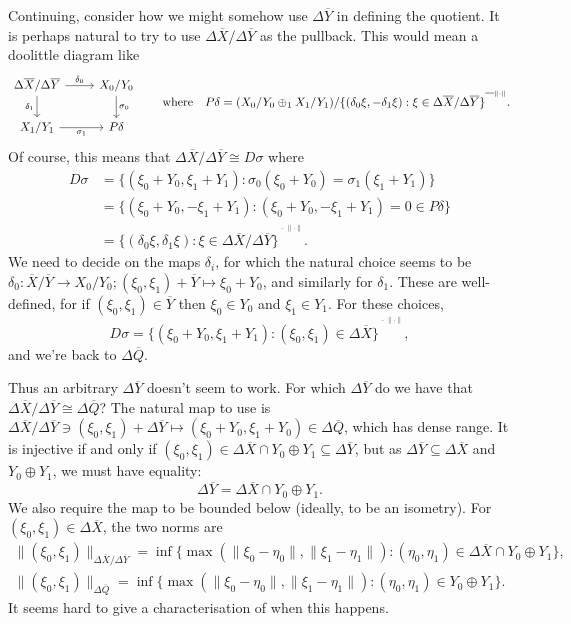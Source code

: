 \documentclass[a4paper,11pt]{article}
\theoremstyle{plain}
\theoremstyle{remark}
\newenvironment{remark}
  {\pushQED{\qed}\renewcommand{\qedsymbol}{$\triangle$}\remarkx}
  {\popQED\endremarkx}
\begin{document}
\begin{remark}
Continuing, consider how we might somehow use $\Delta\overline Y$ in defining the quotient.  It is perhaps natural to try to use $\Delta\overline X / \Delta\overline Y$ as the pullback.  This would mean a doolittle diagram like
\[ \begin{tikzcd}
\Delta\overline X / \Delta\overline Y \arrow[r, "\delta_0"] \arrow[d, "\delta_1"'] & X_0/Y_0 \arrow[d, "\sigma_0"] \\
X_1/Y_1 \arrow[r, "\sigma_1"'] & P\delta
\end{tikzcd}
\qquad\text{where}\quad
P\delta = (X_0/Y_0 \oplus_1 X_1/Y_1) / \{ (\delta_0\xi,-\delta_1\xi) : \xi\in \Delta\overline X / \Delta\overline Y \}^{\overline{\phantom{\{\ }}^{\|\cdot\|}}. \]
Of course, this means that $\Delta\overline X / \Delta\overline Y \cong D\sigma$ where
\begin{align*}
D\sigma &= \{ (\xi_0+Y_0, \xi_1+Y_1) : \sigma_0(\xi_0+Y_0) = \sigma_1(\xi_1+Y_1) \}  \\
&= \{ (\xi_0+Y_0, -\xi_1+Y_1) : (\xi_0+Y_0, -\xi_1+Y_1) = 0 \in P\delta \} \\
&= \{ (\delta_0\xi,\delta_1\xi) : \xi\in \Delta\overline X / \Delta\overline Y \}^{\overline{\phantom{\{\ }}^{\|\cdot\|}}.
\end{align*}
We need to decide on the maps $\delta_i$, for which the natural choice seems to be $\delta_0 \colon \overline X / \overline Y \to X_0/Y_0; (\xi_0,\xi_1)+\overline Y \mapsto \xi_0+Y_0$, and similarly for $\delta_1$.  These are well-defined, for if $(\xi_0,\xi_1)\in\overline Y$ then $\xi_0\in Y_0$ and $\xi_1\in Y_1$.  For these choices,
\[ D\sigma = \{ (\xi_0+Y_0, \xi_1+Y_1) : (\xi_0,\xi_1)\in\Delta\overline X \}^{\overline{\phantom{\{\ }}^{\|\cdot\|}}, \]
and we're back to $\Delta\overline Q$.

Thus an arbitrary $\Delta\overline Y$ doesn't seem to work.  For which $\Delta\overline Y$ do we have that $\Delta\overline X / \Delta\overline Y \cong \Delta\overline Q$?  The natural map to use is $\Delta\overline X / \Delta\overline Y \ni (\xi_0,\xi_1) + \Delta\overline Y \mapsto (\xi_0+Y_0, \xi_1+Y_0) \in \Delta\overline Q$, which has dense range.  It is injective if and only if $(\xi_0,\xi_1)\in\Delta\overline X \cap Y_0\oplus Y_1 \subseteq \Delta\overline Y$, but as $\Delta\overline Y \subseteq \Delta\overline X$ and $Y_0\oplus Y_1$, we must have equality:
\[ \Delta\overline Y = \Delta\overline X \cap Y_0\oplus Y_1. \]
We also require the map to be bounded below (ideally, to be an isometry).  For $(\xi_0,\xi_1) \in \Delta\overline X$, the two norms are
\begin{gather*}
\|(\xi_0,\xi_1)\|_{\Delta\overline X / \Delta\overline Y}
= \inf\big\{ \max(\|\xi_0-\eta_0\|, \|\xi_1-\eta_1\|) : (\eta_0,\eta_1) \in \Delta\overline X \cap Y_0\oplus Y_1 \big\}, \\
\|(\xi_0,\xi_1)\|_{\Delta\overline Q}
= \inf\big\{ \max(\|\xi_0-\eta_0\|, \|\xi_1-\eta_1\|) : (\eta_0,\eta_1) \in Y_0\oplus Y_1 \big\}.
\end{gather*}
It seems hard to give a characterisation of when this happens.


\end{remark}
\end{document}
